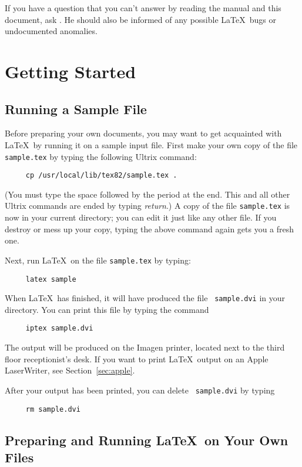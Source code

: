 If you have a question that you can't answer by reading the manual and
this document, ask \contact.  He should also be informed of any
possible \LaTeX\ bugs or undocumented anomalies.


\section{Getting Started}

\subsection{Running a Sample File} \label{sec:sample}

Before preparing your own documents, you may want to get acquainted
with \LaTeX\ by running it on a sample input file.  First make your own
copy of the file \mbox{\tt sample.tex} by typing the following
Ultrix command:
\begin{verbatim}
     cp /usr/local/lib/tex82/sample.tex .
\end{verbatim}
(You must type the space followed by the period at the end.  This
and all other Ultrix commands are ended by typing {\em return}.)
A copy of the file \mbox{\tt sample.tex} is now in your current
directory; you can edit it just like any other file.  If you destroy or
mess up your copy, typing the above command again gets you a fresh
one.

Next, run \LaTeX\ on the file \mbox{\tt sample.tex} by typing:
\begin{verbatim}
     latex sample
\end{verbatim}
When \LaTeX\ has finished, it will have produced the file \mbox{\tt
sample.dvi} in your directory.  You can print this file by typing the
command
\begin{verbatim}
     iptex sample.dvi
\end{verbatim}
The output will be produced on the Imagen printer, located next to the
third floor receptionist's desk.  If you want to print \LaTeX\ output
on an Apple LaserWriter, see Section~\ref{sec:apple}.

After your output has been printed, you can delete \mbox{\tt
sample.dvi} by typing
\begin{verbatim}
     rm sample.dvi
\end{verbatim}

\subsection{Preparing and Running \LaTeX\ on Your Own Files}

